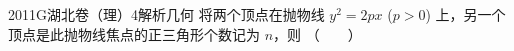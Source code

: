 
\begin{problem}{2011}{G}{湖北卷（理）}{4}{解析几何}
将两个顶点在抛物线 $y^2=2px$ ($p>0$) 上，另一个顶点是此抛物线焦点的正三角形个数记为 $n$，则 \hspace{1cm}（　　）
\begin{choices}
\end{choices}
\end{problem}

\begin{answer}

\end{answer}

\begin{solutions}

\end{solutions}